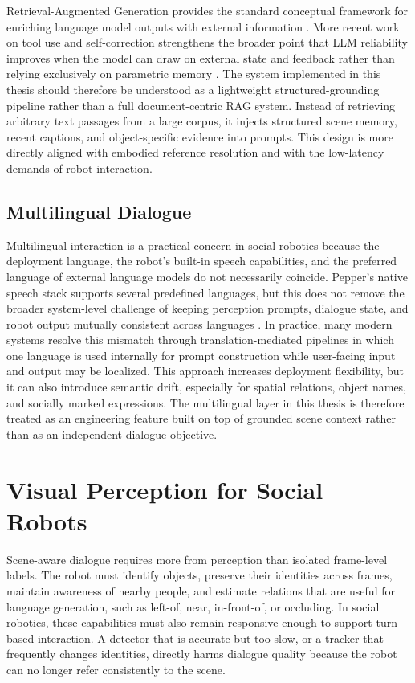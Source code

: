 \documentclass[
  digital,     %
  oneside,     %
  nosansbold,  %
  nocolorbold, %
  lof,         %
  lot,         %
]{fithesis4}
\begin{document}
Retrieval-Augmented Generation provides the standard conceptual framework for enriching language model outputs with external information \cite{lewis_retrieval-augmented_2020}. More recent work on tool use and self-correction strengthens the broader point that LLM reliability improves when the model can draw on external state and feedback rather than relying exclusively on parametric memory \cite{schick_toolformer_2023, gou_critic_2023}. The system implemented in this thesis should therefore be understood as a lightweight structured-grounding pipeline rather than a full document-centric RAG system. Instead of retrieving arbitrary text passages from a large corpus, it injects structured scene memory, recent captions, and object-specific evidence into prompts. This design is more directly aligned with embodied reference resolution and with the low-latency demands of robot interaction.

\subsection{Multilingual Dialogue}
Multilingual interaction is a practical concern in social robotics because the deployment language, the robot's built-in speech capabilities, and the preferred language of external language models do not necessarily coincide. Pepper's native speech stack supports several predefined languages, but this does not remove the broader system-level challenge of keeping perception prompts, dialogue state, and robot output mutually consistent across languages \cite{softbank_alspeechrecognition_2026}. In practice, many modern systems resolve this mismatch through translation-mediated pipelines in which one language is used internally for prompt construction while user-facing input and output may be localized. This approach increases deployment flexibility, but it can also introduce semantic drift, especially for spatial relations, object names, and socially marked expressions. The multilingual layer in this thesis is therefore treated as an engineering feature built on top of grounded scene context rather than as an independent dialogue objective.

\section{Visual Perception for Social Robots}
Scene-aware dialogue requires more from perception than isolated frame-level labels. The robot must identify objects, preserve their identities across frames, maintain awareness of nearby people, and estimate relations that are useful for language generation, such as left-of, near, in-front-of, or occluding. In social robotics, these capabilities must also remain responsive enough to support turn-based interaction. A detector that is accurate but too slow, or a tracker that frequently changes identities, directly harms dialogue quality because the robot can no longer refer consistently to the scene.
\end{document}
